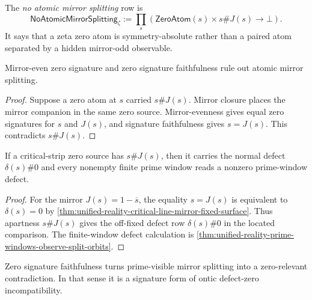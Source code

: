 \begin{definition}
\label{def:unified-reality-no-atomic-mirror-splitting}
The \emph{no atomic mirror splitting} row is
$$
\mathsf{NoAtomicMirrorSplitting}_{\zeta}
:=
\prod_s
\left(
\mathsf{ZeroAtom}(s)\times s\#J(s)
\to
\bot
\right).
$$
It says that a zeta zero atom is symmetry-absolute rather than a paired
atom separated by a hidden mirror-odd observable.
\end{definition}

\begin{theorem}
\label{thm:unified-reality-signature-faithfulness-rules-out-mirror-splitting}
Mirror-even zero signature and zero signature faithfulness rule out
atomic mirror splitting.
\end{theorem}

\begin{proof}
Suppose a zero atom at $s$ carried $s\#J(s)$.  Mirror closure places the
mirror companion in the same zero source.  Mirror-evenness gives equal
zero signatures for $s$ and $J(s)$, and signature faithfulness gives
$s=J(s)$.  This contradicts $s\#J(s)$.
\end{proof}

\begin{theorem}
\label{thm:unified-reality-split-mirror-zero-prime-defect}
If a critical-strip zero source has $s\#J(s)$, then it carries the
normal defect $\delta(s)\#0$ and every nonempty finite prime window reads
a nonzero prime-window defect.
\end{theorem}

\begin{proof}
For the mirror $J(s)=1-\overline{s}$, the equality $s=J(s)$ is
equivalent to $\delta(s)=0$ by
\autoref{thm:unified-reality-critical-line-mirror-fixed-surface}.  Thus
apartness $s\#J(s)$ gives the off-fixed defect row
$\delta(s)\#0$ in the located comparison.  The finite-window defect
calculation is
\autoref{thm:unified-reality-prime-windows-observe-split-orbits}.
\end{proof}

\begin{corollary}
\label{cor:unified-reality-signature-faithfulness-zero-relevance-defect-rigidity}
Zero signature faithfulness turns prime-visible mirror splitting into a
zero-relevant contradiction.  In that sense it is a signature form of
ontic defect-zero incompatibility.
\end{corollary}

